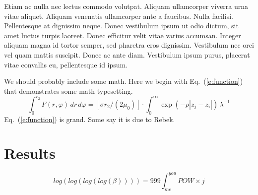 \documentclass[]{aiaa-tc}%
\begin{document}
Etiam ac nulla nec lectus commodo volutpat. Aliquam ullamcorper viverra urna vitae aliquet. Aliquam venenatis ullamcorper ante a faucibus. Nulla facilisi. Pellentesque at dignissim neque. Donec vestibulum ipsum ut odio dictum, sit amet luctus turpis laoreet. Donec efficitur velit vitae varius accumsan. Integer aliquam magna id tortor semper, sed pharetra eros dignissim. Vestibulum nec orci vel quam mattis suscipit. Donec ac ante diam. Vestibulum ipsum purus, placerat vitae convallis eu, pellentesque id ipsum.

We should probably include some math.
Here we begin with Eq.~(\ref{e:function}) that demonstrates some math
typesetting.
\begin{equation}
 \label{e:function}
 \int_{0}^{r_{2}} F(r,\varphi) \, dr \, d\varphi =
    \left[ \sigma r_{2}/(2\mu_{0}) \right] \cdot
    \int_{0}^{\infty} \exp(-\rho|z_{j}-z_{i}|) \, \lambda^{-1} 
\end{equation}
Eq.~(\ref{e:function}) is grand.
Some say it is due to Rebek.\cite{rebek:82bk}

\section{Results}

\begin{equation}
    log(log(log(log(\beta)))) = 999 \int_{me}^{you} POW \times j
\end{equation}
\end{document}
